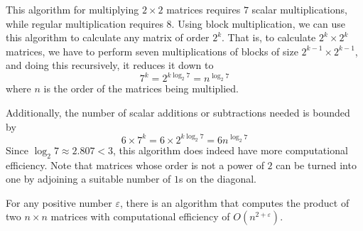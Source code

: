   This algorithm for multiplying $2\times 2$ matrices requires $7$ scalar multiplications, while regular multiplication requires $8$. Using block multiplication, we can use this algorithm to calculate any matrix of order $2^k$. That is, to calculate $2^k \times 2^k$ matrices, we have to perform seven multiplications of blocks of size $2^{k-1} \times 2^{k-1}$, and doing this recursively, it reduces it down to 
  \begin{equation}
    7^k = 2^{k \log_2{7}} = n^{\log_2{7}}
  \end{equation}
  where $n$ is the order of the matrices being multiplied. 

  Additionally, the number of scalar additions or subtractions needed is bounded by 
  \begin{equation}
    6 \times 7^k = 6 \times 2^{k \log_2{7}} = 6 n^{\log_2{7}}
  \end{equation}
  Since $\log_2{7} \approx 2.807 < 3$, this algorithm does indeed have more computational efficiency. Note that matrices whose order is not a power of $2$ can be turned into one by adjoining a suitable number of $1$s on the diagonal. 

  \begin{theorem}[Conjecture]
    For any positive number $\varepsilon$, there is an algorithm that computes the product of two $n \times n$ matrices with computational efficiency of $O(n^{2 + \varepsilon})$. 
  \end{theorem}

